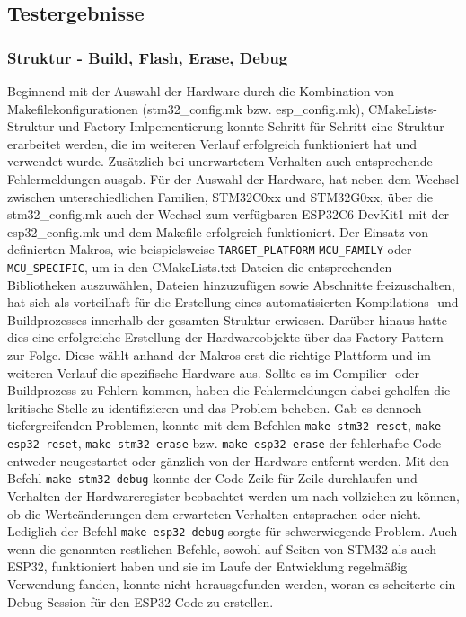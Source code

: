 \subsection*{Testergebnisse}
\subsubsection{Struktur - Build, Flash, Erase, Debug}
Beginnend mit der Auswahl der Hardware durch die Kombination von Makefilekonfigurationen (stm32\_config.mk bzw. esp\_config.mk), CMakeLists-Struktur und Factory-Imlpementierung konnte Schritt für Schritt eine Struktur erarbeitet werden, die im weiteren Verlauf erfolgreich funktioniert hat und verwendet wurde.
Zusätzlich bei unerwartetem Verhalten auch entsprechende Fehlermeldungen ausgab.
Für der Auswahl der Hardware, hat neben dem Wechsel zwischen unterschiedlichen Familien, STM32C0xx und STM32G0xx, über die stm32\_config.mk auch der Wechsel zum verfügbaren ESP32C6-DevKit1 mit der esp32\_config.mk und dem Makefile erfolgreich funktioniert.
Der Einsatz von definierten Makros, wie beispielsweise \texttt{TARGET\_PLATFORM} \texttt{MCU\_FAMILY} oder \texttt{MCU\_SPECIFIC}, um in den CMakeLists.txt-Dateien die entsprechenden Bibliotheken auszuwählen, Dateien hinzuzufügen sowie Abschnitte freizuschalten, hat sich als vorteilhaft für die Erstellung eines automatisierten Kompilations- und Buildprozesses innerhalb der gesamten Struktur erwiesen.
Darüber hinaus hatte dies eine erfolgreiche Erstellung der Hardwareobjekte über das Factory-Pattern zur Folge.
Diese wählt anhand der Makros erst die richtige Plattform und im weiteren Verlauf die spezifische Hardware aus.
Sollte es im Compilier- oder Buildprozess zu Fehlern kommen, haben die Fehlermeldungen dabei geholfen die kritische Stelle zu identifizieren und das Problem beheben.
Gab es dennoch tiefergreifenden Problemen, konnte mit dem Befehlen \texttt{make stm32-reset}, \texttt{make esp32-reset}, \texttt{make stm32-erase} bzw. \texttt{make esp32-erase} der fehlerhafte Code entweder neugestartet oder gänzlich von der Hardware entfernt werden.
Mit den Befehl \texttt{make stm32-debug} konnte der Code Zeile für Zeile durchlaufen und Verhalten der Hardwareregister beobachtet werden um nach vollziehen zu können, ob die Werteänderungen dem erwarteten Verhalten entsprachen oder nicht.
Lediglich der Befehl \texttt{make esp32-debug} sorgte für schwerwiegende Problem. 
Auch wenn die genannten restlichen Befehle, sowohl auf Seiten von STM32 als auch ESP32, funktioniert haben und sie im Laufe der Entwicklung regelmäßig Verwendung fanden, konnte nicht herausgefunden werden, woran es scheiterte ein Debug-Session für den ESP32-Code zu erstellen.

